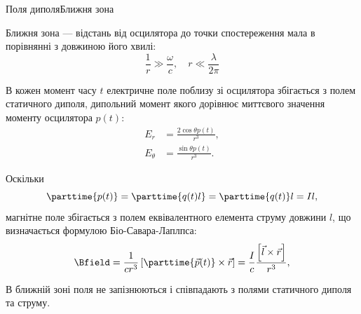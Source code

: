 \documentclass[onlytextwidth]{beamer}
\let\vect\vec
\begin{document}
\begin{frame}{Поля диполя}{Ближня зона}
	\begin{block}{}
		Ближня зона --- відстань від осцилятора до точки спостереження  мала в порівнянні з
		довжиною його хвилі:
		\begin{equation*}
			\frac1r \gg \frac{\omega}c, \quad	r \ll \frac{\lambda}{2\pi}
		\end{equation*}
	\end{block}

	\begin{overprint}
		\begin{block}{}\justifying
			В кожен момент часу $ t $ електричне поле поблизу
			зі осцилятора збігається з полем статичного диполя, дипольний момент якого дорівнює миттєвого значення моменту осцилятора $  p(t) $:
			\begin{align*}
				E_r        & = \frac{2\cos\theta p(t)}{r^3},  \\
				E_{\theta} & =  \frac{\sin\theta p(t)}{r^3} .
			\end{align*}
		\end{block}
		\begin{block}{}
			Оскільки
			\begin{equation*}
				\parttime{p(t)} = \parttime{q(t)l} = \parttime{q(t)}l = I l,
			\end{equation*}
			магнітне поле збігається з полем еквівалентного елемента струму довжини $ l $, що визначається формулою Біо-Савара-Лаплпса:
			\begin{equation*}
				\Bfield   = \frac{1}{cr^3} \left[ \parttime{\vect{p}(t)}\times\vect{r}\right] = \frac{I}{c} \frac{\left[ \vect{l}\times\vect{r}\right] }{r^3},
			\end{equation*}
		\end{block}
		\begin{alertblock}{}
			В ближній зоні поля не запізнюються і співпадають з полями статичного диполя та струму.
		\end{alertblock}
	\end{overprint}
\end{frame}
\end{document}
